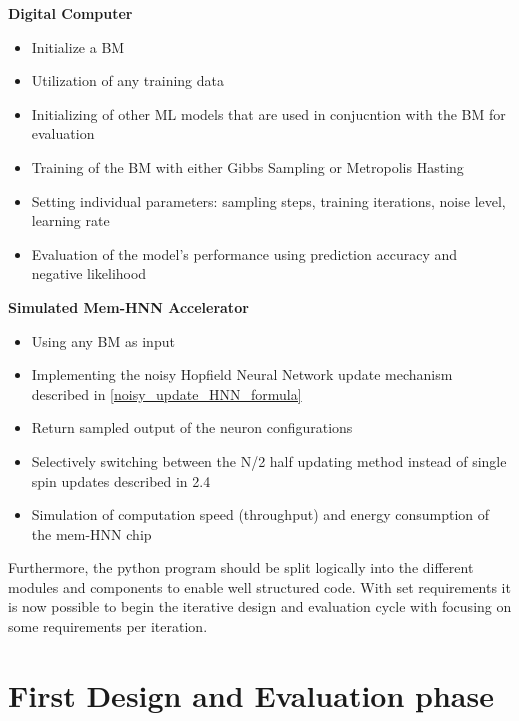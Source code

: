 \textbf{Digital Computer}
\begin{itemize}
    \item Initialize a \ac{BM}
    \item Utilization of any training data
    \item Initializing of other ML models that are used in conjucntion with the \ac{BM} for evaluation
    \item Training of the \ac{BM} with either Gibbs Sampling or Metropolis Hasting
    \item Setting individual parameters: sampling steps, training iterations, noise level, learning rate 
    \item Evaluation of the model's performance using prediction accuracy and negative likelihood
\end{itemize}
\textbf{Simulated Mem-HNN Accelerator}
\begin{itemize}
    \item Using any \ac{BM} as input
    \item Implementing the noisy Hopfield Neural Network update mechanism described in \ref{noisy_update_HNN_formula}
    \item Return sampled output of the neuron configurations 
    \item Selectively switching between the N/2 half updating method instead of single spin updates described in 2.4
    \item Simulation of computation speed (throughput) and energy consumption of the \ac{mem-HNN} chip
\end{itemize}
Furthermore, the python program should be split logically into the different modules and components to enable well structured code. 
With set requirements it is now possible to begin the iterative design and evaluation cycle with focusing on some requirements per iteration.

\section{First Design and Evaluation phase}

